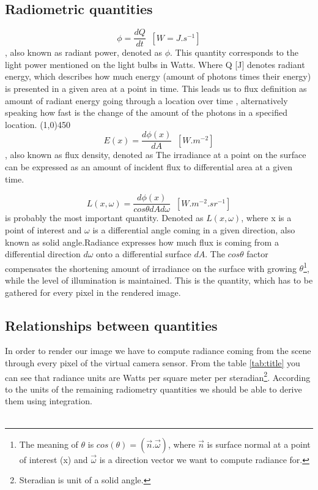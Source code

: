 \subsection{Radiometric quantities}
\begin{equation}
\phi=\frac{dQ}{dt}\;\;[W=J.s^{-1}]
\end{equation}
, also known as radiant power, denoted as $\phi$. This quantity corresponds to the light power mentioned on the light bulbs in Watts.
Where Q [J] denotes radiant energy, which describes how much energy (amount of photons times their energy) is presented in a given area at a point in time. This leads us to flux definition as  amount of radiant energy going through a location over time , alternatively speaking how fast is the change of the amount of the photons in a specified location. 
\line(1,0){450}
\begin{equation}
E(x)=\frac{d\phi(x)}{dA}\;\;[W.m^{-2}]
\end{equation}
, also known as flux density, denoted as  The irradiance at a point  on the surface  can be expressed as an amount of incident flux to differential area at a given time.

\begin{equation}
\label{eg:rd}
L(x,\omega)=\frac{d\phi(x)}{cos\theta dAd \omega}\;\;[W.m^{-2}.sr^{-1}]
\end{equation}
 is probably the most important quantity. Denoted as $L(x,\omega)$, where x is a point of interest and $\omega$ is a differential angle coming in a given direction, also known as solid angle.Radiance expresses how much flux is coming from a differential direction $d\omega$ onto a differential surface $dA$. The $cos\theta$ factor compensates the shortening amount of irradiance on the surface with growing $\theta$\footnote{The meaning of $\theta$ is $cos(\theta)=(\vec{n}.\vec{\omega})$, where $\vec{n}$ is surface normal at a point of interest (x) and $\vec{\omega}$ is a direction vector we want to compute radiance for.}, while the level of illumination is maintained. This is the quantity, which has to be gathered for every pixel in the rendered image.

\subsection{Relationships between quantities}
In order to render our image we have to compute radiance coming from the scene through every pixel of the virtual camera sensor. From the table \ref{tab:title} you can see that radiance units are Watts per square meter per steradian\footnote{Steradian is unit of a solid angle.}. According to the units of the remaining radiometry quantities we should be able to derive them using integration.\\
\\

